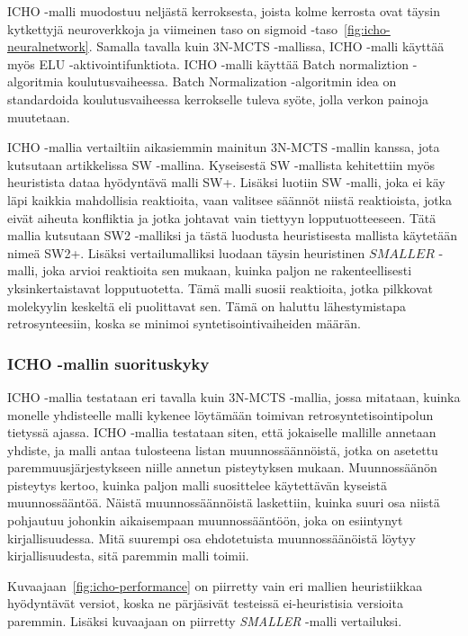 \documentclass[finnish,twoside,censored,tkt,sw-line]{HYthesisML}
\begin{document}
ICHO -malli muodostuu neljästä kerroksesta, joista kolme kerrosta ovat täysin kytkettyjä neuroverkkoja ja viimeinen taso on sigmoid -taso~\ref{fig:icho-neuralnetwork}.
Samalla tavalla kuin 3N-MCTS -mallissa, ICHO -malli käyttää myös ELU -aktivointifunktiota.
ICHO -malli käyttää Batch normaliztion -algoritmia koulutusvaiheessa.
Batch Normalization -algoritmin idea on standardoida koulutusvaiheessa kerrokselle tuleva syöte, jolla verkon painoja muutetaan.

ICHO -mallia vertailtiin aikasiemmin mainitun 3N-MCTS -mallin kanssa, jota kutsutaan artikkelissa SW -mallina.
Kyseisestä SW -mallista kehitettiin myös heuristista dataa hyödyntävä malli SW+.
Lisäksi luotiin SW -malli, joka ei käy läpi kaikkia mahdollisia reaktioita, vaan valitsee säännöt niistä reaktioista, jotka eivät aiheuta konfliktia ja jotka johtavat vain tiettyyn lopputuotteeseen.
Tätä mallia kutsutaan SW2 -malliksi ja tästä luodusta heuristisesta mallista käytetään nimeä SW2+.
Lisäksi vertailumalliksi luodaan täysin heuristinen \(SMALLER\) -malli, joka arvioi reaktioita sen mukaan, kuinka paljon ne rakenteellisesti yksinkertaistavat lopputuotetta.
Tämä malli suosii reaktioita, jotka pilkkovat molekyylin keskeltä eli puolittavat sen.
Tämä on haluttu lähestymistapa retrosynteesiin, koska se minimoi syntetisointivaiheiden määrän.

\subsubsection{ICHO -mallin suorituskyky}

ICHO -mallia testataan eri tavalla kuin 3N-MCTS -mallia, jossa mitataan, kuinka monelle yhdisteelle malli kykenee löytämään toimivan retrosyntetisointipolun tietyssä ajassa.
ICHO -mallia testataan siten, että jokaiselle mallille annetaan yhdiste, ja malli antaa tulosteena listan muunnossäännöistä, jotka on asetettu paremmuusjärjestykseen niille annetun pisteytyksen mukaan.
Muunnossäänön pisteytys kertoo, kuinka paljon malli suosittelee käytettävän kyseistä muunnossääntöä.
Näistä muunnossäännöistä laskettiin, kuinka suuri osa niistä pohjautuu johonkin aikaisempaan muunnossääntöön, joka on esiintynyt kirjallisuudessa.
Mitä suurempi osa ehdotetuista muunnossäänöistä löytyy kirjallisuudesta, sitä paremmin malli toimii.

Kuvaajaan~\ref{fig:icho-performance} on piirretty vain eri mallien heuristiikkaa hyödyntävät versiot, koska ne pärjäsivät testeissä ei-heuristisia versioita paremmin.
Lisäksi kuvaajaan on piirretty \emph{SMALLER} -malli vertailuksi.
\end{document}
